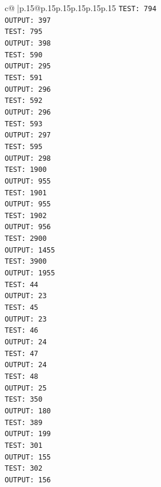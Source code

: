 \documentclass{article}
\begin{document}
{\begin{supertabular}{c@{$\;$}|p{.15\linewidth}@{}p{.15\linewidth}p{.15\linewidth}p{.15\linewidth}p{.15\linewidth}p{.15\linewidth}}
{{{\texttt{TEST: 794} \\
\texttt{OUTPUT: 397} \\
\texttt{TEST: 795} \\
\texttt{OUTPUT: 398} \\
\texttt{TEST: 590} \\
\texttt{OUTPUT: 295} \\
\texttt{TEST: 591} \\
\texttt{OUTPUT: 296} \\
\texttt{TEST: 592} \\
\texttt{OUTPUT: 296} \\
\texttt{TEST: 593} \\
\texttt{OUTPUT: 297} \\
\texttt{TEST: 595} \\
\texttt{OUTPUT: 298} \\
\texttt{TEST: 1900} \\
\texttt{OUTPUT: 955} \\
\texttt{TEST: 1901} \\
\texttt{OUTPUT: 955} \\
\texttt{TEST: 1902} \\
\texttt{OUTPUT: 956} \\
\texttt{TEST: 2900} \\
\texttt{OUTPUT: 1455} \\
\texttt{TEST: 3900} \\
\texttt{OUTPUT: 1955} \\
\texttt{TEST: 44} \\
\texttt{OUTPUT: 23} \\
\texttt{TEST: 45} \\
\texttt{OUTPUT: 23} \\
\texttt{TEST: 46} \\
\texttt{OUTPUT: 24} \\
\texttt{TEST: 47} \\
\texttt{OUTPUT: 24} \\
\texttt{TEST: 48} \\
\texttt{OUTPUT: 25} \\
\texttt{TEST: 350} \\
\texttt{OUTPUT: 180} \\
\texttt{TEST: 389} \\
\texttt{OUTPUT: 199} \\
\texttt{TEST: 301} \\
\texttt{OUTPUT: 155} \\
\texttt{TEST: 302} \\
\texttt{OUTPUT: 156} \\
}}}
\end{supertabular}}
\end{document}
